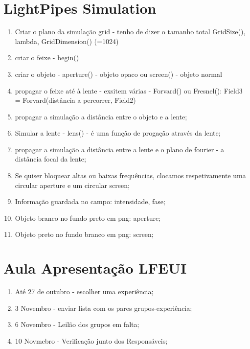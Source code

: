 \documentclass{article}
\begin{document}
\newpage 

\section*{LightPipes Simulation}


\begin{enumerate}
  \item Criar o plano da simulação grid - tenho de dizer o tamanho total GridSize(), lambda, GridDimension() (=1024)
  \item criar o feixe - begin()
  \item criar o objeto - aperture() - objeto opaco ou screen() - objeto normal
  \item propagar o feixe até à lente - exsitem várias - Forvard() ou Fresnel(): Field3 = Forvard(distância  a percorrer, Field2)
  \item propagar a simulação a distância entre o objeto e a lente;
  \item Simular a lente - lens() - é uma função de progação através da lente;
  \item propagar a simulação a distância entre a lente e o plano de fourier - a distância focal da lente;
  \item Se quiser bloquear altas ou baixas frequências, clocamos respetivamente uma circular aperture e um circular screen;
  \item Informação guardada no campo: intensidade, fase;
  \item Objeto branco no fundo preto em png: aperture;
  \item Objeto preto no fundo branco em png: screen;
\end{enumerate}


\newpage

\section*{Aula Apresentação LFEUI}

\begin{enumerate}
  \item Até 27 de outubro - escolher uma experiência;
  \item 3 Novembro - enviar lista com os pares grupos-experiência;
  \item 6 Novembro - Leilão dos grupos em falta;
  \item 10 Novmebro - Verificação junto dos Responsáveis;
\end{enumerate}
\end{document}

